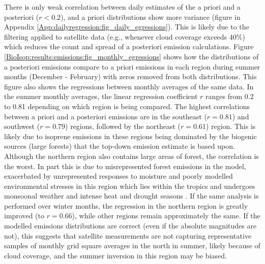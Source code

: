     There is only weak correlation between daily estimates of the a priori and a posteriori ($r < 0.2$), and a priori distributions show more variance (figure in Appendix \ref{App:dailyregression:fig_daily_egressions}).
    This is likely due to the filtering applied to satellite data (e.g., whenever cloud coverage exceeds 40\%) which reduces the count and spread of a posteriori emission calculations.
    Figure \ref{BioIsop:results:emissions:fig_monthly_egressions} shows how the distributions of a posteriori emissions compare to a priori emissions in each region during summer months (December - February) with zeros removed from both distributions. %
    This figure also shows the regressions between monthly averages of the same data. 
    In the summer monthly averages, the linear regression coefficient $r$ ranges from 0.2 to 0.81 depending on which region is being compared.
    The highest correlations between a priori and a posteriori emissions are in the southeast ($r=0.81$) and southwest ($r=0.79$) regions, followed by the northeast ($r=0.61$) region.
    This is likely due to isoprene emissions in these regions being dominated by the biogenic sources (large forests) that the top-down emission estimate is based upon.
    Although the northern region also contains large areas of forest, the correlation is the worst.
    In part this is due to misrepresented forest emissions in the model, exacerbated by unrepresented responses to moisture and poorly modelled environmental stresses in this region which lies within the tropics and undergoes monsoonal weather and intense heat and drought seasons \parencite[e.g.,][]{Emmerson2016,Surl2018,Emmerson2019}.
    If the same analysis is performed over winter months, the regression in the northern region is greatly improved (to $r=0.66$), while other regions remain approximately the same.
    If the modelled emissions distributions are correct (even if the absolute magnitudes are not), this suggests that satellite measurements are not capturing representative samples of monthly grid square averages in the north in summer, likely because of cloud coverage, and the summer inversion in this region may be biased.
    
